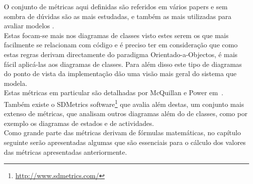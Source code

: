 O conjunto de métricas aqui definidas são referidos em vários papers e sem sombra de dúvidas são as mais estudadas, e também as mais utilizadas para avaliar modelos \uml.\\
Estas focam-se mais nos diagramas de classes visto estes serem os que mais facilmente se relacionam com código e é preciso ter em consideração que como estas regras derivam 
directamente do paradigma Orientado-a-Objectos, é mais fácil aplicá-las aos diagramas de classes. Para além disso este tipo de diagramas do ponto de vista da implementação 
dão uma visão mais geral do sistema que modela.\\
Estas métricas em particular são detalhadas por McQuillan e Power em~\cite{Power}. Também existe o SDMetrics software\footnote{{\url{http://www.sdmetrics.com/}}} que avalia além destas, um conjunto
 mais extenso de métricas, que analisam outros diagramas além do de classes, como por exemplo os diagramas de estados e de actividades. \\ 
Como grande parte das métricas derivam de fórmulas matemáticas, no capítulo seguinte serão apresentadas algumas que são essenciais para o cálculo dos
valores das métricas apresentadas anteriormente.
